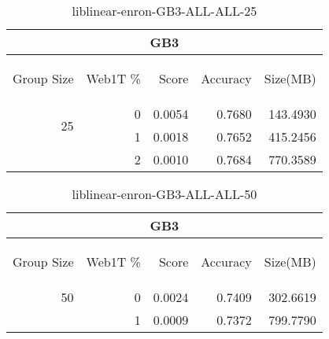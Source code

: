 \begin{center}
\begin{table}[htbp] 
 \begin{center}
\begin{tabular}{ | r | r | r | r | r |}
\hline
\multicolumn{5}{|c|}{GB3}\\
\hline
\begin{sideways}Group Size\end{sideways} & \begin{sideways}Web1T \%\end{sideways} & \begin{sideways}Score\end{sideways} & \begin{sideways}Accuracy\end{sideways} & \begin{sideways}Size(MB)\end{sideways}\\
\hline
\multirow{2}{*}{25}
 & 0 & 0.0054 & 0.7680 & 143.4930\\ \cline{2-5}
 & 1 & 0.0018 & 0.7652 & 415.2456\\ \cline{2-5}
 & 2 & 0.0010 & 0.7684 & 770.3589\\ \cline{2-5}
\hline
\end{tabular}
\caption{liblinear-enron-GB3-ALL-ALL-25}
\label{table:liblinear-enron-GB3-ALL-ALL-25}
\end{center}
 \end{table}
\end{center}

\begin{center}
\begin{table}[htbp] 
 \begin{center}
\begin{tabular}{ | r | r | r | r | r |}
\hline
\multicolumn{5}{|c|}{GB3}\\
\hline
\begin{sideways}Group Size\end{sideways} & \begin{sideways}Web1T \%\end{sideways} & \begin{sideways}Score\end{sideways} & \begin{sideways}Accuracy\end{sideways} & \begin{sideways}Size(MB)\end{sideways}\\
\hline
\multirow{1}{*}{50}
 & 0 & 0.0024 & 0.7409 & 302.6619\\ \cline{2-5}
 & 1 & 0.0009 & 0.7372 & 799.7790\\ \cline{2-5}
\hline
\end{tabular}
\caption{liblinear-enron-GB3-ALL-ALL-50}
\label{table:liblinear-enron-GB3-ALL-ALL-50}
\end{center}
 \end{table}
\end{center}

